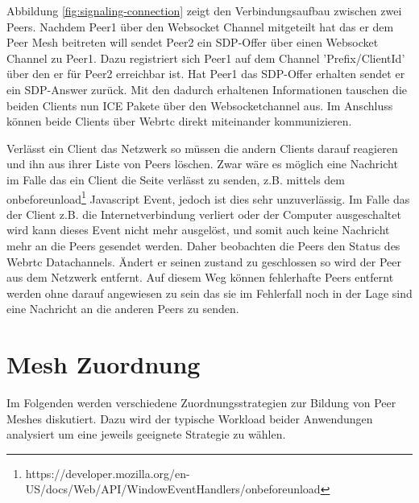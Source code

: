 Abbildung \ref{fig:signaling-connection} zeigt den Verbindungsaufbau zwischen zwei Peers. Nachdem Peer1 über den Websocket Channel mitgeteilt hat das er dem Peer Mesh beitreten will sendet Peer2 ein SDP-Offer über einen Websocket Channel zu Peer1. Dazu registriert sich Peer1 auf dem Channel '{Prefix}/{ClientId}' über den er für Peer2 erreichbar ist. Hat Peer1 das SDP-Offer erhalten sendet er ein SDP-Answer zurück. Mit den dadurch erhaltenen Informationen tauschen die beiden Clients nun ICE Pakete über den Websocketchannel aus. Im Anschluss können beide Clients über Webrtc direkt miteinander kommunizieren. 

Verlässt ein Client das \pTp Netzwerk so müssen die andern Clients darauf reagieren und ihn aus ihrer Liste von Peers löschen. Zwar wäre es möglich eine Nachricht im Falle das ein Client die Seite verlässt zu senden, z.B. mittels dem onbeforeunload\footnote{https://developer.mozilla.org/en-US/docs/Web/API/WindowEventHandlers/onbeforeunload} Javascript Event, jedoch ist dies sehr unzuverlässig. Im Falle das der Client z.B. die Internetverbindung verliert oder der Computer ausgeschaltet wird kann dieses Event nicht mehr ausgelöst, und somit auch keine Nachricht mehr an die Peers gesendet werden. Daher beobachten die Peers den Status des Webrtc Datachannels. Ändert er seinen zustand zu geschlossen so wird der Peer aus dem Netzwerk entfernt. Auf diesem Weg können fehlerhafte Peers entfernt werden ohne darauf angewiesen zu sein das sie im Fehlerfall noch in der Lage sind eine Nachricht an die anderen Peers zu senden.


\section{Mesh Zuordnung}
Im Folgenden werden verschiedene Zuordnungsstrategien zur Bildung von Peer Meshes diskutiert. Dazu wird der typische Workload beider Anwendungen analysiert um eine jeweils geeignete Strategie zu wählen. 

